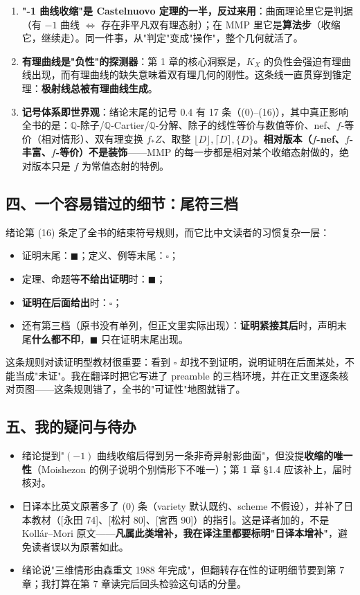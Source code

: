 \begin{enumerate}
\item \textbf{"-1 曲线收缩"是 Castelnuovo 定理的一半，反过来用}：曲面理论里它是判据（有 $-1$ 曲线 $\Longleftrightarrow$ 存在非平凡双有理态射）；在 MMP 里它是\textbf{算法步}（收缩它，继续走）。同一件事，从"判定"变成"操作"，整个几何就活了。
\item \textbf{有理曲线是"负性"的探测器}：第 1 章的核心洞察是，$K_X$ 的负性会强迫有理曲线出现，而有理曲线的缺失意味着双有理几何的刚性。这条线一直贯穿到锥定理：\textbf{极射线总被有理曲线生成}。
\item \textbf{记号体系即世界观}：绪论末尾的记号 0.4 有 17 条（(0)--(16)），其中真正影响全书的是：$\mathbb{Q}$-除子/$\mathbb{Q}$-Cartier/$\mathbb{Q}$-分解、除子的线性等价与数值等价、nef、$f$-等价（相对情形）、双有理变换 $f_*Z$、取整 $\lfloor D\rfloor,\lceil D\rceil,\{D\}$。\textbf{相对版本（$f$-nef、$f$-丰富、$f$-等价）不是装饰}——MMP 的每一步都是相对某个收缩态射做的，绝对版本只是 $f$ 为常值态射的特例。
\end{enumerate}

\subsection*{四、一个容易错过的细节：尾符三档}

绪论第 (16) 条定了全书的结束符号规则，而它比中文读者的习惯复杂一层：

\begin{itemize}
\item 证明末尾：$\blacksquare$；定义、例等末尾：$\square$；
\item 定理、命题等\textbf{不给出证明}时：$\blacksquare$；
\item \textbf{证明在后面给出}时：$\square$；
\item 还有第三档（原书没有单列，但正文里实际出现）：\textbf{证明紧接其后}时，声明末尾\textbf{什么都不印}，$\blacksquare$ 只在证明末尾出现。
\end{itemize}

这条规则对读证明型教材很重要：看到 $\square$ 却找不到证明，说明证明在后面某处，不能当成"未证"。我在翻译时把它写进了 preamble 的三档环境，并在正文里逐条核对页图——这条规则错了，全书的"可证性"地图就错了。

\subsection*{五、我的疑问与待办}

\begin{itemize}
\item 绪论提到"$(-1)$ 曲线收缩后得到另一条非奇异射影曲面"，但没提\textbf{收缩的唯一性}（Moishezon 的例子说明个别情形下不唯一）；第 1 章 \S1.4 应该补上，届时核对。
\item 日译本比英文原著多了 (0) 条（variety 默认既约、scheme 不假设），并补了日本教材（[永田 74]、[松村 80]、[宮西 90]）的指引。这是译者加的，不是 Kollár--Mori 原文——\textbf{凡属此类增补，我在译注里都要标明"日译本增补"}，避免读者误以为原著如此。
\item 绪论说"三维情形由森重文 1988 年完成"，但翻转存在性的证明细节要到第 7 章；我打算在第 7 章读完后回头检验这句话的分量。
\end{itemize}

